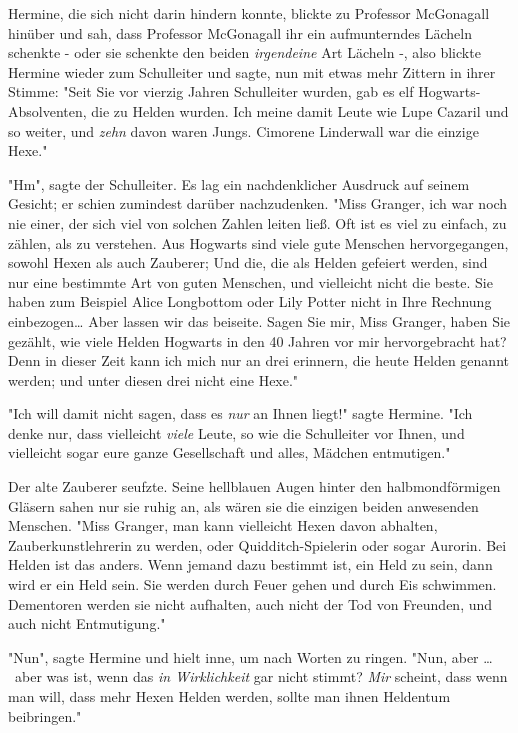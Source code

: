 {Hermine, die sich nicht darin hindern konnte, blickte zu Professor McGonagall hinüber und sah, dass Professor McGonagall ihr ein aufmunterndes Lächeln schenkte - oder sie schenkte den beiden \emph{irgendeine} Art Lächeln -, also blickte Hermine wieder zum Schulleiter und sagte, nun mit etwas mehr Zittern in ihrer Stimme: "Seit Sie vor vierzig Jahren Schulleiter wurden, gab es elf Hogwarts-Absolventen, die zu Helden wurden. Ich meine damit Leute wie Lupe Cazaril und so weiter, und \emph{zehn} davon waren Jungs. Cimorene Linderwall war die einzige Hexe."

"Hm", sagte der Schulleiter. Es lag ein nachdenklicher Ausdruck auf seinem Gesicht; er schien zumindest darüber nachzudenken. "Miss Granger, ich war noch nie einer, der sich viel von solchen Zahlen leiten ließ. Oft ist es viel zu einfach, zu zählen, als zu verstehen. Aus Hogwarts sind viele gute Menschen hervorgegangen, sowohl Hexen als auch Zauberer; Und die, die als Helden gefeiert werden, sind nur eine bestimmte Art von guten Menschen, und vielleicht nicht die beste. Sie haben zum Beispiel Alice Longbottom oder Lily Potter nicht in Ihre Rechnung einbezogen… Aber lassen wir das beiseite. Sagen Sie mir, Miss Granger, haben Sie gezählt, wie viele Helden Hogwarts in den 40 Jahren vor mir hervorgebracht hat? Denn in dieser Zeit kann ich mich nur an drei erinnern, die heute Helden genannt werden; und unter diesen drei nicht eine Hexe."

"Ich will damit nicht sagen, dass es \emph{nur} an Ihnen liegt!" sagte Hermine. "Ich denke nur, dass vielleicht \emph{viele} Leute, so wie die Schulleiter vor Ihnen, und vielleicht sogar eure ganze Gesellschaft und alles, Mädchen entmutigen."

Der alte Zauberer seufzte. Seine hellblauen Augen hinter den halbmondförmigen Gläsern sahen nur sie ruhig an, als wären sie die einzigen beiden anwesenden Menschen. "Miss Granger, man kann vielleicht Hexen davon abhalten, Zauberkunstlehrerin zu werden, oder Quidditch-Spielerin oder sogar Aurorin. Bei Helden ist das anders. Wenn jemand dazu bestimmt ist, ein Held zu sein, dann wird er ein Held sein. Sie werden durch Feuer gehen und durch Eis schwimmen. Dementoren werden sie nicht aufhalten, auch nicht der Tod von Freunden, und auch nicht Entmutigung."

"Nun", sagte Hermine und hielt inne, um nach Worten zu ringen. "Nun, aber … ~aber was ist, wenn das \emph{in Wirklichkeit} gar nicht stimmt? \emph{Mir} scheint, dass wenn man will, dass mehr Hexen Helden werden, sollte man ihnen Heldentum beibringen."

}
